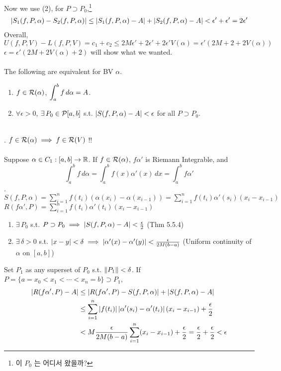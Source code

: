 Now we use (2), for $P\supset P_0$,\footnote{이 $P_0$ 는 어디서 왔을까?}
$$\begin{aligned}
\left|S_1(f, P, \alpha) - S_2(f, P, \alpha)\right| \leq \left|S_1(f, P, \alpha) - A\right| + \left|S_2(f, P, \alpha) - A\right| < \epsilon' + \epsilon' = 2\epsilon'
\end{aligned}$$
Overall, $$U(f, P, V)-L(f, P, V) = c_1+c_2 \leq 2M\epsilon' + 2\epsilon' + 2\epsilon'V(\alpha) = \epsilon'(2M+2+2V(\alpha))$$
$\epsilon = \epsilon'(2M+2V(\alpha) + 2)$ will show what we wanted.\\
\\
 The following are equivalent for BV $\alpha$.
\begin{enumerate}
	\item $f\in \mathcal{R}(\alpha)$, $\displaystyle \int_a^b f\,d\alpha = A$.
	\item $\forall \epsilon > 0$, $\exists \, P_0\in \mathcal{P}[a, b]$ s.t. $\left|S(f, P, \alpha) - A\right| < \epsilon$ for all $P \supset P_0$.
\end{enumerate}~\\
\rmk. $f\in \mathcal{R}(\alpha) \implies f\in \mathcal{R}(V)$ !!\\
\\
 Suppose $\alpha \in C_1 : [a, b]\rightarrow\mathbb{R}$. If $f \in \mathcal{R}(\alpha)$,
$f\alpha'$ is Riemann Integrable, and
$$\int_a^b f \,d\alpha = \int_a^b f(x)\alpha'(x)\,dx = \int_a^b f \alpha'$$
\pf. $S(f, P, \alpha) = \sum_{i=1}^n f(t_i)(\alpha(x_i) - \alpha(x_{i-1})) = \sum_{i=1}^n f(t_i)\alpha'(s_i)(x_i-x_{i-1})$
$R(f\alpha', P) = \sum_{i=1}^n f(t_i)\alpha'(t_i)(x_{i}-x_{i-1})$
\begin{enumerate}
	\item $\exists\,P_0$ s.t. $P\supset P_0 \implies \left|S(f, P, \alpha) -A\right| < \frac{\epsilon}{2}$ (Thm 5.5.4)
	\item $\exists\,\delta > 0$ s.t. $\left|x-y\right| < \delta \implies \left|\alpha'(x) - \alpha'(y)\right| < \frac{\epsilon}{2M(b-a)}$ (Uniform continuity of $\alpha$ on $[a, b]$)
\end{enumerate}
Set $P_1$ as any superset of $P_0$ s.t. $\left\lVert P_1\right\rVert < \delta$. If $P = \{a =x_0<x_1<\cdots <x_n=b \} \supset P_1$,
$$\begin{aligned}
\left|R(f\alpha', P) - A\right| &\leq \left|R(f\alpha', P)-S(f, P, \alpha)\right| + \left|S(f, P, \alpha) - A\right| \\ 
&\leq \sum_{i=1}^n \left|f(t_i)\right| \left|\alpha'(s_i) - \alpha'(t_i)\right| (x_i-x_{i-1}) + \frac{\epsilon}{2}\\
&< M\frac{\epsilon}{2M(b-a)} \sum_{i=1}^n (x_i-x_{i-1}) + \frac{\epsilon}{2} = \frac{\epsilon}{2} + \frac{\epsilon}{2} < \epsilon
\end{aligned}$$
